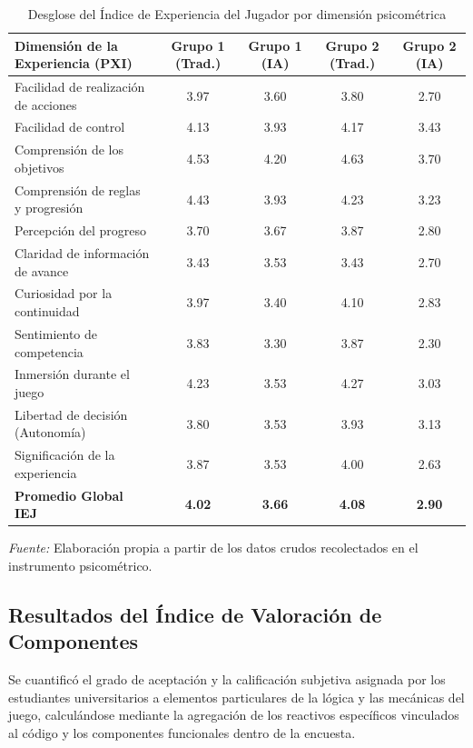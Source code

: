 \begin{table}[H]
    \centering
    \caption{Desglose del Índice de Experiencia del Jugador por dimensión psicométrica}
    \label{tab:desglose-iej-pxi}
    \small
    \begin{tabularx}{\textwidth}{X c c c c}
        \toprule
        \textbf{Dimensión de la Experiencia (PXI)} & 
        \textbf{Grupo 1 (Trad.)} & 
        \textbf{Grupo 1 (IA)} & 
        \textbf{Grupo 2 (Trad.)} & 
        \textbf{Grupo 2 (IA)} \\ 
        \midrule
        Facilidad de realización de acciones & 3.97 & 3.60 & 3.80 & 2.70 \\
        Facilidad de control & 4.13 & 3.93 & 4.17 & 3.43 \\
        Comprensión de los objetivos & 4.53 & 4.20 & 4.63 & 3.70 \\
        Comprensión de reglas y progresión & 4.43 & 3.93 & 4.23 & 3.23 \\
        Percepción del progreso & 3.70 & 3.67 & 3.87 & 2.80 \\
        Claridad de información de avance & 3.43 & 3.53 & 3.43 & 2.70 \\
        Curiosidad por la continuidad & 3.97 & 3.40 & 4.10 & 2.83 \\
        Sentimiento de competencia & 3.83 & 3.30 & 3.87 & 2.30 \\
        Inmersión durante el juego & 4.23 & 3.53 & 4.27 & 3.03 \\
        Libertad de decisión (Autonomía) & 3.80 & 3.53 & 3.93 & 3.13 \\
        Significación de la experiencia & 3.87 & 3.53 & 4.00 & 2.63 \\ 
        \midrule
        \textbf{Promedio Global IEJ} & \textbf{4.02} & \textbf{3.66} & \textbf{4.08} & \textbf{2.90} \\ 
        \bottomrule
    \end{tabularx}
    \vspace{0.2cm}
    \raggedright{\small \textit{Fuente:} Elaboración propia a partir de los datos crudos recolectados en el instrumento psicométrico.}
\end{table}

\subsection{Resultados del Índice de Valoración de Componentes}

Se cuantificó el grado de aceptación y la calificación subjetiva asignada por los estudiantes universitarios a elementos particulares de la lógica y las mecánicas del juego, calculándose mediante la agregación de los reactivos específicos vinculados al código y los componentes funcionales dentro de la encuesta.

